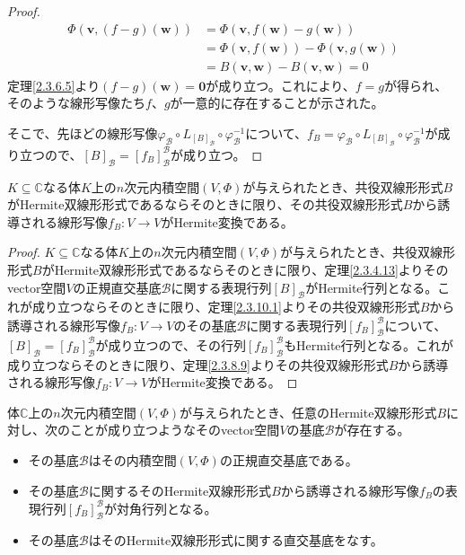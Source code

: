\documentclass[dvipdfmx]{jsarticle}
\begin{document}
\begin{proof}
\begin{align*}
\varPhi\left( \mathbf{v},(f - g)\left( \mathbf{w} \right) \right) &= \varPhi\left( \mathbf{v},f\left( \mathbf{w} \right) - g\left( \mathbf{w} \right) \right)\\
&= \varPhi\left( \mathbf{v},f\left( \mathbf{w} \right) \right) - \varPhi\left( \mathbf{v},g\left( \mathbf{w} \right) \right)\\
&= B\left( \mathbf{v},\mathbf{w} \right) - B\left( \mathbf{v},\mathbf{w} \right) = 0
\end{align*}
定理\ref{2.3.6.5}より$(f - g)\left( \mathbf{w} \right) = \mathbf{0}$が成り立つ。これにより、$f = g$が得られ、そのような線形写像たち$f$、$g$が一意的に存在することが示された。\par
そこで、先ほどの線形写像$\varphi_{\mathcal{B}} \circ L_{[ B]_{\mathcal{B}}} \circ \varphi_{\mathcal{B}}^{- 1}$について、$f_{B} = \varphi_{\mathcal{B}} \circ L_{[ B]_{\mathcal{B}}} \circ \varphi_{\mathcal{B}}^{- 1}$が成り立つので、$[ B]_{\mathcal{B}} = \left[ f_{B} \right]_{\mathcal{B}}^{\mathcal{B}}$が成り立つ。
\end{proof}
\begin{thm}\label{2.3.10.2}
$K \subseteq \mathbb{C}$なる体$K$上の$n$次元内積空間$(V,\varPhi)$が与えられたとき、共役双線形形式$B$がHermite双線形形式であるならそのときに限り、その共役双線形形式$B$から誘導される線形写像$f_{B}:V \rightarrow V$がHermite変換である。
\end{thm}
\begin{proof}
$K \subseteq \mathbb{C}$なる体$K$上の$n$次元内積空間$(V,\varPhi)$が与えられたとき、共役双線形形式$B$がHermite双線形形式であるならそのときに限り、定理\ref{2.3.4.13}よりそのvector空間$V$の正規直交基底$\mathcal{B}$に関する表現行列$[ B]_{\mathcal{B}}$がHermite行列となる。これが成り立つならそのときに限り、定理\ref{2.3.10.1}よりその共役双線形形式$B$から誘導される線形写像$f_{B}:V \rightarrow V$のその基底$\mathcal{B}$に関する表現行列$\left[ f_{B} \right]_{\mathcal{B}}^{\mathcal{B}}$について、$[ B]_{\mathcal{B}} = \left[ f_{B} \right]_{\mathcal{B}}^{\mathcal{B}}$が成り立つので、その行列$\left[ f_{B} \right]_{\mathcal{B}}^{\mathcal{B}}$もHermite行列となる。これが成り立つならそのときに限り、定理\ref{2.3.8.9}よりその共役双線形形式$B$から誘導される線形写像$f_{B}:V \rightarrow V$がHermite変換である。
\end{proof}
\begin{thm}[Euclid幾何学の立場で標準的な正規直交基底の存在性]\label{2.3.10.3}
体$\mathbb{C}$上の$n$次元内積空間$(V,\varPhi)$が与えられたとき、任意のHermite双線形形式$B$に対し、次のことが成り立つようなそのvector空間$V$の基底$\mathcal{B}$が存在する。
\begin{itemize}
\item
  その基底$\mathcal{B}$はその内積空間$(V,\varPhi)$の正規直交基底である。
\item
  その基底$\mathcal{B}$に関するそのHermite双線形形式$B$から誘導される線形写像$f_{B}$の表現行列$\left[ f_{B} \right]_{\mathcal{B}}^{\mathcal{B}}$が対角行列となる。
\item
  その基底$\mathcal{B}$はそのHermite双線形形式に関する直交基底をなす。
\end{itemize}
\end{thm}
\end{document}
